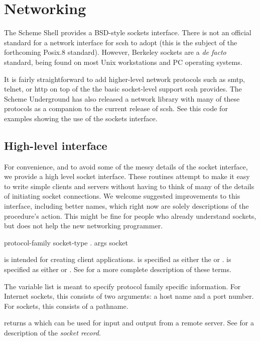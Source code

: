 
\chapter{Networking}

The Scheme Shell provides a BSD-style sockets interface. 
There is not an official standard for a network interface
for scsh to adopt (this is the subject of the forthcoming Posix.8
standard).
However, Berkeley sockets are a \emph{de facto} standard,
being found on most Unix workstations and PC operating systems.

It is fairly straightforward to add higher-level network protocols
such as smtp, telnet, or http on top of the the basic socket-level
support scsh provides.
The Scheme Underground has also released a network library with
many of these protocols as a companion to the current release of scsh.
See this code for examples showing the use of the sockets interface.

\section{High-level interface}

For convenience, and to avoid some of the messy details of the socket
interface, we provide a high level socket interface. These routines
attempt to make it easy to write simple clients and servers without
having to think of many of the details of initiating socket connections.
We welcome suggested improvements to this interface, including better
names, which right now are solely descriptions of the procedure's action.
This might be fine for people who already understand sockets,
but does not help the new networking programmer.

 {protocol-family socket-type . args} {socket}
\begin{desc}
 is intended for creating client applications.
 is specified as either the
 or .
 is specified as either  or
. See  for a more complete
description of these terms. 

The variable  list is meant to specify protocol family
specific information. For Internet sockets, this consists of two
arguments: a host name and a port number. For {\Unix} sockets, this
consists of a pathname.

 returns a  which can be used for input
and output from a remote server. See  for a description of
the \emph{socket record}.
\end{desc}

